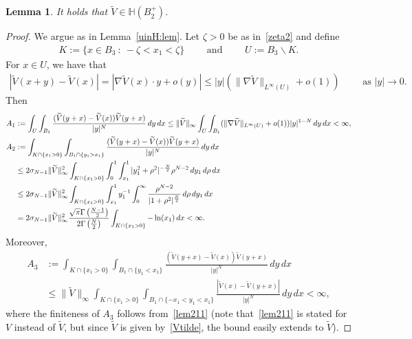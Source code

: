 \documentclass[11pt]{article}
\numberwithin{equation}{section}
\newtheorem{lemma}[theorem]{Lemma}
\begin{document}
\begin{lemma}\label{V:lem:4}
It holds that $\widetilde V\in {\mathbb H}(B_2^+)$.
\end{lemma}
\begin{proof}
We argue as in Lemma~\ref{uinH:lem}. Let $\zeta>0$ be as in~\eqref{zeta2} and define 
\begin{align*}
K:=\{x\in B_3\::\:-\zeta<x_1<\zeta\}\qquad \text{ and } \qquad U:=B_3\backslash K.
\end{align*}
 For $x\in U$, we have that
\begin{align*}
    |\widetilde V(x+y)-\widetilde V(x)|=|\nabla \widetilde V(x)\cdot y+o(y)|\leq |y|(\|\nabla \widetilde V\|_{L^\infty(U)}+o(1))\qquad \text{ as }|y|\to 0.
\end{align*}
Then
\begin{align}
A_1&:=\int_{U}\int_{B_1}\frac{(\widetilde V(y+x)-\widetilde V(x))\widetilde V(y+x)}{|y|^N} \, dy\, dx
\leq \|\widetilde V\|_\infty \int_{U}\int_{B_1} (\|\nabla \widetilde V\|_{L^\infty(U)}+o(1))|y|^{1-N}\, dy\, dx<\infty,\notag\\ \notag
A_2&:=\int_{K\cap\{x_1>0\}}\int_{B_1\cap\{y_1>x_1\}}\frac{(\widetilde V(y+x)-\widetilde V(x))\widetilde V(y+x)}{|y|^N} \, dy\, dx\\
&\leq 2\sigma_{N-1}\|\widetilde V\|^2_\infty 
\int_{K\cap\{x_1>0\}}\int_{0}^1\int_{x_1}^1|y_1^2+\rho^2|^{-\frac{N}{2}}\rho^{N-2}\,dy_1 \, d\rho\, dx\notag\\
&\leq 2\sigma_{N-1}\|\widetilde V\|^2_\infty 
\int_{K\cap\{x_1>0\}}\int_{x_1}^1y_1^{-1} \int_{0}^{\infty}\frac{\rho^{N-2}}{|1+\rho^2|^{\frac{N}{2}}}\, d\rho\,dy_1 \, dx\notag\\
&=2\sigma_{N-1}\|\widetilde V\|^2_\infty \frac{\sqrt{\pi } \Gamma \left(\frac{N-1}{2}\right)}{2 \Gamma \left(\frac{N}{2}\right)}
\int_{K\cap\{x_1>0\}}-\ln(x_1) \, dx<\infty.\label{b}
\end{align}
Moreover, 
\begin{align*}
A_3&:=\int_{K\cap\{x_1>0\}}\int_{B_1\cap\{y_1<x_1\}}\frac{(\widetilde V(y+x)-\widetilde V(x))\widetilde V(y+x)}{|y|^N} \, dy\, dx\\
&\leq \|\widetilde V\|_\infty\int_{K\cap\{x_1>0\}}\int_{B_1\cap\{-x_1<y_1<x_1\}}\frac{|\widetilde V(x)-\widetilde V(y+x)|}{|y|^N} \, dy\, dx<\infty,
\end{align*}
where the finiteness of $A_3$ follows from~\eqref{lem211} (note that~\eqref{lem211} is stated for $V$ instead of $\widetilde V$, but since $\widetilde V$ is given by~\eqref{Vtilde}, the bound easily extends to $\widetilde V$).


\end{proof}
\end{document}

